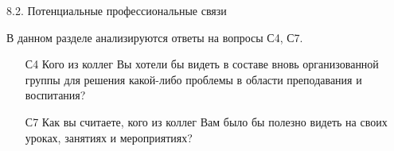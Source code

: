 \begin{frame}{8.2. Потенциальные профессиональные связи }

\tiny

В данном разделе анализируются ответы на вопросы С4, С7.
\bigskip

\begin{itemize}

\item [С4] Кого из коллег Вы хотели бы видеть в составе вновь организованной группы для решения какой-либо проблемы в области преподавания и воспитания?

\item [С7] Как вы считаете, кого из коллег Вам было бы полезно видеть на своих уроках, занятиях и мероприятиях?

\end{itemize}
\end{frame}


